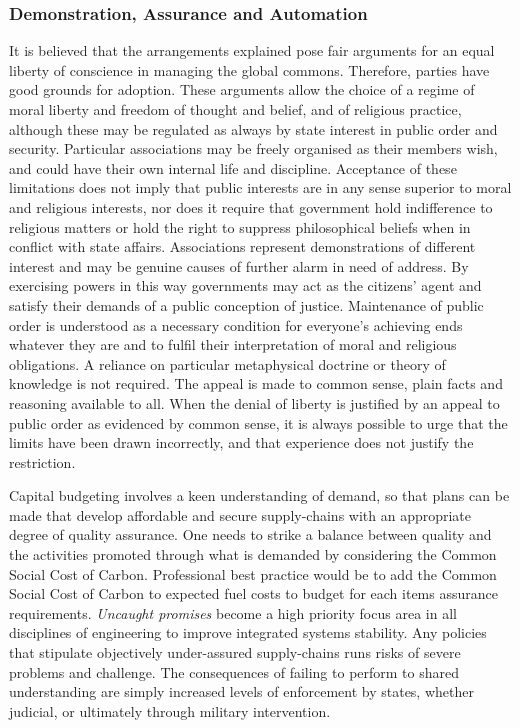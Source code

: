 \documentclass[11pt, oneside]{article}   	%
\begin{document}
\subsubsection{Demonstration, Assurance and Automation}
It is believed that the arrangements explained pose fair arguments for an equal liberty of conscience in managing the global commons.
Therefore, parties have good grounds for adoption.
These arguments allow the choice of a regime of moral liberty and freedom of thought and belief, and of religious practice, although these may be regulated as always by state interest in public order and security.
Particular associations may be freely organised as their members wish, and could have their own internal life and discipline.
Acceptance of these limitations does not imply that public interests are in any sense superior to moral and religious interests, nor does it require that government hold indifference to religious matters or hold the right to suppress philosophical beliefs when in conflict with state affairs.
Associations represent demonstrations of different interest and may be genuine causes of further alarm in need of address.
By exercising powers in this way governments may act as the citizens' agent and satisfy their demands of a public conception of justice.
Maintenance of public order is understood as a necessary condition for everyone's achieving ends whatever they are and to fulfil their interpretation of moral and religious obligations.
A reliance on particular metaphysical doctrine or theory of knowledge is not required.
The appeal is made to common sense, plain facts and reasoning available to all.
When the denial of liberty is justified by an appeal to public order as evidenced by common sense, it is always possible to urge that the limits have been drawn incorrectly, and that experience does not justify the restriction.\

Capital budgeting involves a keen understanding of demand, so that plans can be made that develop affordable and secure supply-chains with an appropriate degree of quality assurance.
One needs to strike a balance between quality and the activities promoted through what is demanded by considering the Common Social Cost of Carbon.
Professional best practice would be to add the Common Social Cost of Carbon to expected fuel costs to budget for each items assurance requirements.
\emph{Uncaught promises} become a high priority focus area in all disciplines of engineering to improve integrated systems stability.
Any policies that stipulate objectively under-assured supply-chains runs risks of severe problems and challenge.
The consequences of failing to perform to shared understanding are simply increased levels of enforcement by states, whether judicial, or ultimately through military intervention.\
\end{document}
